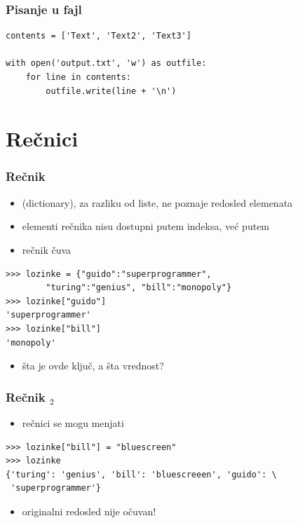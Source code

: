 \documentclass[compress]{beamer}
\begin{document}
\begin{frame}[fragile]
\frametitle{Pisanje u fajl}

\begin{verbatim}
contents = ['Text', 'Text2', 'Text3']

with open('output.txt', 'w') as outfile:
    for line in contents:
        outfile.write(line + '\n')
\end{verbatim}
\end{frame}

\section[Dict]{Rečnici}

\begin{frame}[fragile]
  \frametitle{Rečnik}
  \begin{itemize}
    \item {} (dictionary), za razliku od liste, ne poznaje redosled elemenata
    \item elementi rečnika nisu dostupni putem indeksa, već putem 
    \item rečnik čuva 
  \end{itemize}
\begin{verbatim}
>>> lozinke = {"guido":"superprogrammer", 
        "turing":"genius", "bill":"monopoly"}
>>> lozinke["guido"]
'superprogrammer'
>>> lozinke["bill"]
'monopoly'
\end{verbatim}
  \begin{itemize}
    \item šta je ovde ključ, a šta vrednost?
  \end{itemize}
\end{frame}

\begin{frame}[fragile]
  \frametitle{Rečnik $_2$}
  \begin{itemize}
    \item rečnici se mogu menjati
  \end{itemize}
\begin{verbatim}
>>> lozinke["bill"] = "bluescreen"
>>> lozinke
{'turing': 'genius', 'bill': 'bluescreeen', 'guido': \
 'superprogrammer'}
\end{verbatim}
  \begin{itemize}
    \item originalni redosled nije očuvan!
  \end{itemize}
\end{frame}
\end{document}
